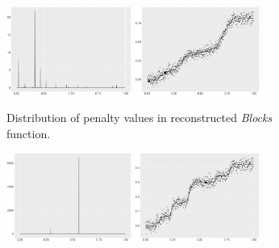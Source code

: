 \begin{figure}
    \centering
    \begin{subfigure}{\textwidth}
    \centering
    \includegraphics[width=0.45\textwidth]{Chapters/02TractorSplineTheory/plot/ggplot/ggBlocksPenaltyBar.pdf}
    \includegraphics[width=0.45\textwidth]{Chapters/02TractorSplineTheory/plot/ggplot/ggBlocksPenaltyLine.pdf}
    \caption{Distribution of penalty values in reconstructed \textit{Blocks} function.}
    \end{subfigure}
    \begin{subfigure}{\textwidth}
    \centering
    \includegraphics[width=0.45\textwidth]{Chapters/02TractorSplineTheory/plot/ggplot/ggBumpsPenaltyBar.pdf}
    \includegraphics[width=0.45\textwidth]{Chapters/02TractorSplineTheory/plot/ggplot/ggBumpsPenaltyLine.pdf}

\end{subfigure}
\end{figure}
